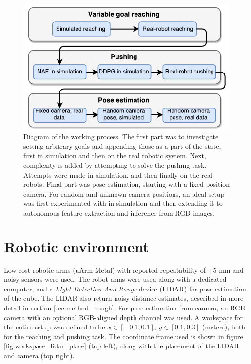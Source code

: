\begin{figure}
    \centering
    \includegraphics[width=0.80 \textwidth]{res/process-diagram.pdf}

    \caption{Diagram of the working process. The first part was to investigate
    setting arbitrary goals and appending those as a part of the state, first
    in simulation and then on the real robotic system. Next, complexity is
    added by attempting to solve the pushing task. Attempts were made in
    simulation, and then finally on the real robots. Final part was pose
    estimation, starting with a fixed position camera. For random and unknown
    camera positions, an ideal setup was first experimented with in simulation
    and then extending it to autonomous feature extraction and inference from
    RGB images.}

    \label{fig:process-diagram}
\end{figure}

\section{Robotic environment}
\label{sec:robo_env}

Low cost robotic arms (uArm Metal) with reported repeatability of $\pm 5$ mm
and noisy sensors were used. The robot arms were used along with a dedicated
computer, and a \textit{LIght Detection And Range}-device (LIDAR) for pose
estimation of the cube. The LIDAR also return noisy distance estimates,
described in more detail in section \ref{sec:method_hough}. For pose estimation
from camera, an RGB-camera with an optional RGB-aligned depth channel was used.
A workspace for the entire setup was defined to be $x \in [-0.1, 0.1]$, $y \in
[0.1, 0.3]$ (meters), both for the reaching and pushing task. The coordinate
frame used is shown in figure \ref{fig:workspace_lidar_place} (top left), along
with the placement of the LIDAR and camera (top right).

